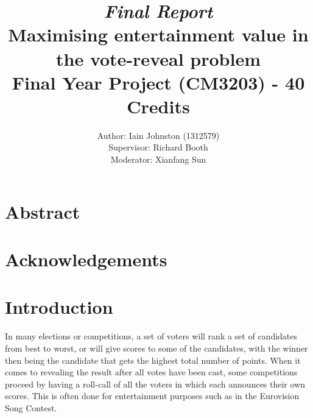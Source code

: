 \documentclass[12pt]{report}
\title{\textit{Final Report}\\\textbf{Maximising entertainment value in the vote-reveal problem}\\ Final Year Project (CM3203) - 40 Credits}
\author{Author: Iain Johnston (1312579) \\ Supervisor: Richard Booth\\ Moderator: Xianfang Sun}
\date{} %
\begin{document}
\maketitle
\clearpage

\section*{Abstract}

\section*{Acknowledgements}

\tableofcontents %
\listoffigures
\listoftables
\clearpage %

\section{Introduction}\label{Introduction}
In many elections or competitions, a set of voters will rank a set of candidates from best to worst, or will give scores to some of the candidates, with the winner then being the candidate that gets the highest total number of points. When it comes to revealing the result after all votes have been cast, some competitions proceed by having a roll-call of all the voters in which each announces their own scores. This is often done for entertainment purposes such as in the Eurovision Song Contest.\cite{EurovisionVoting}
\end{document}
